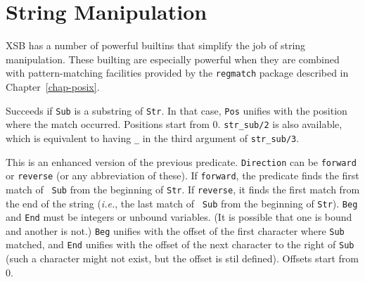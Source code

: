 \section{String Manipulation}
\label{sec-strings}

	XSB has a number of powerful builtins that simplify the job of string
manipulation. These builting are especially powerful when they are combined
with pattern-matching facilities provided by the {\tt regmatch} package
described in Chapter~\ref{chap-posix}.

\begin{description}

Succeeds if {\tt Sub} is a substring of {\tt Str}. In that case, {\tt Pos}
unifies with the position where the match occurred. Positions start
from 0. {\tt str\_sub/2} is also available, which is equivalent
to having {\tt \_} in the third argument of {\tt str\_sub/3}.


This is an enhanced version of the previous predicate.
{\tt Direction} can be {\tt forward} or {\tt reverse} (or any abbreviation
of these). If {\tt forward}, the predicate finds the first match of {\tt
  Sub} from the beginning of {\tt Str}. If {\tt reverse}, it finds the
first match from the end of the string ({\it i.e.}, the last match of {\tt
  Sub} from the beginning of {\tt Str}). {\tt Beg} and {\tt End} must be
integers or unbound variables. (It is possible that one is bound and
another is not.)
{\tt Beg} unifies with the offset of the first character where {\tt Sub}
matched, and {\tt End} unifies with the offset of the next character to the
right of {\tt Sub} (such a character might not exist, but the offset is
stil defined). Offsets start from 0.


\end{description}
